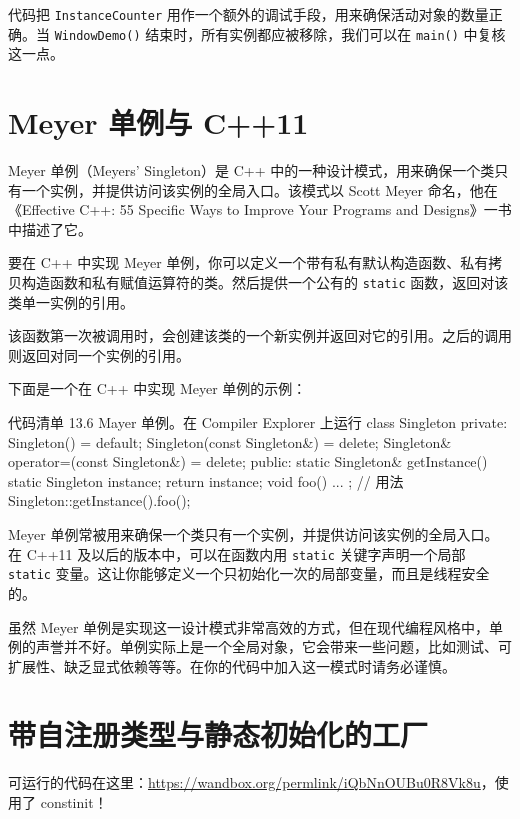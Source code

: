 代码把 \texttt{InstanceCounter} 用作一个额外的调试手段，用来确保活动对象的数量正确。当 \texttt{WindowDemo()} 结束时，所有实例都应被移除，我们可以在 \texttt{main()} 中复核这一点。

\section{Meyer 单例与 C++11}

Meyer 单例（Meyers' Singleton）是 C++ 中的一种设计模式，用来确保一个类只有一个实例，并提供访问该实例的全局入口。该模式以 Scott Meyer 命名，他在《Effective C++: 55 Specific Ways to Improve Your Programs and Designs》一书中描述了它。

要在 C++ 中实现 Meyer 单例，你可以定义一个带有私有默认构造函数、私有拷贝构造函数和私有赋值运算符的类。然后提供一个公有的 \texttt{static} 函数，返回对该类单一实例的引用。

该函数第一次被调用时，会创建该类的一个新实例并返回对它的引用。之后的调用则返回对同一个实例的引用。

下面是一个在 C++ 中实现 Meyer 单例的示例：

\begin{codeboxt}[cpp]{代码清单 13.6 Mayer 单例。在 Compiler Explorer 上运行}
class Singleton {
private:
Singleton() = default;
Singleton(const Singleton&) = delete;
Singleton& operator=(const Singleton&) = delete;
public:
static Singleton& getInstance() {
static Singleton instance;
return instance;
}
void foo() { ... }
};
// 用法
Singleton::getInstance().foo();
\end{codeboxt}

Meyer 单例常被用来确保一个类只有一个实例，并提供访问该实例的全局入口。在 C++11 及以后的版本中，可以在函数内用 \texttt{static} 关键字声明一个局部 \texttt{static} 变量。这让你能够定义一个只初始化一次的局部变量，而且是线程安全的。

\begin{myWarnBox}
虽然 Meyer 单例是实现这一设计模式非常高效的方式，但在现代编程风格中，单例的声誉并不好。单例实际上是一个全局对象，它会带来一些问题，比如测试、可扩展性、缺乏显式依赖等等。在你的代码中加入这一模式时请务必谨慎。
\end{myWarnBox}

\section{带自注册类型与静态初始化的工厂}

可运行的代码在这里：\url{https://wandbox.org/permlink/iQbNnOUBu0R8Vk8u}，使用了 constinit！

